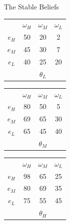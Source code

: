 \documentclass[aspectratio=169]{beamer}
\begin{document}
\begin{frame}{The Stable Beliefs}

    \centering
    \begin{tabular}{ c|c|c|c|}
    
    \multicolumn{1}{c}{} & \multicolumn{1}{c}{$\omega_H$} & \multicolumn{1}{c}{$\omega_M$} & \multicolumn{1}{c}{$\omega_L$}\\
    \cline{2-4}
    $e_H$ & \cellcolor[HTML]{b84f79}50 & 20 & 2 \\
    \cline{2-4}
    $e_M$ & 45 & \cellcolor[HTML]{5f94b8}30 & 7 \\
    \cline{2-4}
    $e_L$ & \cellcolor[HTML]{69a35b}40 & 25 & 20 \\
    \cline{2-4}
    \multicolumn{1}{c}{} & \multicolumn{1}{c}{} & \multicolumn{1}{c}{$\theta_L$} & \multicolumn{1}{c}{}\\
    \end{tabular}
    \hspace{.3cm} %
    \begin{tabular}{ c|c|c|c|}
    
    \multicolumn{1}{c}{} & \multicolumn{1}{c}{$\omega_H$} & \multicolumn{1}{c}{$\omega_M$} & \multicolumn{1}{c}{$\omega_L$}\\
    \cline{2-4}
    $e_H$ & 80 & \cellcolor[HTML]{b84f79}50 & 5 \\
    \cline{2-4}
    $e_M$ & \cellcolor[HTML]{fab143}69 & 65 & \cellcolor[HTML]{5f94b8}30 \\
    \cline{2-4}
    $e_L$ & 65 & \cellcolor[HTML]{9662f0}45 & \cellcolor[HTML]{69a35b}40 \\
    \cline{2-4}
    \multicolumn{1}{c}{} & \multicolumn{1}{c}{} & \multicolumn{1}{c}{$\theta_M$} & \multicolumn{1}{c}{}\\
    \end{tabular}
    \hspace{.3cm} %
    \begin{tabular}{ c|c|c|c|}
    
    \multicolumn{1}{c}{} & \multicolumn{1}{c}{$\omega_H$} & \multicolumn{1}{c}{$\omega_M$} & \multicolumn{1}{c}{$\omega_L$}\\
    \cline{2-4}
    $e_H$ & 98 & 65 & 25 \\
    \cline{2-4}
    $e_M$ & 80 & \cellcolor[HTML]{fab143}69 & 35 \\
    \cline{2-4}
    $e_L$ & 75 & 55 & \cellcolor[HTML]{9662f0}45 \\
    \cline{2-4}
    \multicolumn{1}{c}{} & \multicolumn{1}{c}{} & \multicolumn{1}{c}{$\theta_H$} & \multicolumn{1}{c}{}\\
    \end{tabular}
\end{frame}
\end{document}
